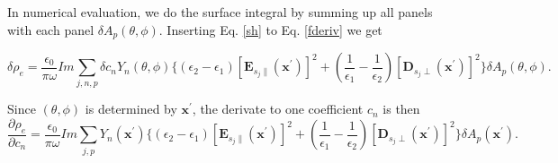 \documentclass[12pt]{article}
\begin{document}
In numerical evaluation, we do the surface integral by summing up all panels with each panel $\delta A_p(\theta,\phi)$. Inserting Eq. \eqref{sh} to Eq. \eqref{fderiv} we get

\begin{equation}
\delta \rho_e =  \frac{\epsilon_0}{\pi\omega}Im\sum_{j,n,p} \delta c_nY_n(\theta,\phi) \{(\epsilon_2 -\epsilon_1) [\mathbf{E}_{s_j\parallel}(\mathbf{x}^\prime)]^2+ (\frac{1}{\epsilon_1}-\frac{1}{\epsilon_2})[\mathbf{D}_{s_j\perp}(\mathbf{x}^\prime)]^2\}\delta A_p(\theta,\phi).\label{sdelta}
\end{equation}

Since $(\theta,\phi)$ is determined by $\mathbf{x}^\prime$, the derivate to one coefficient $c_n$ is then
\begin{equation}
\frac{\partial \rho_e}{\partial c_n} =  \frac{\epsilon_0}{\pi\omega}Im\sum_{j,p}Y_n(\mathbf{x}^\prime) \{(\epsilon_2 -\epsilon_1) [\mathbf{E}_{s_j\parallel}(\mathbf{x}^\prime)]^2+ (\frac{1}{\epsilon_1}-\frac{1}{\epsilon_2})[\mathbf{D}_{s_j\perp}(\mathbf{x}^\prime)]^2\}\delta A_p(\mathbf{x}^\prime).\label{sderiv}
\end{equation}
%
%
\end{document}
